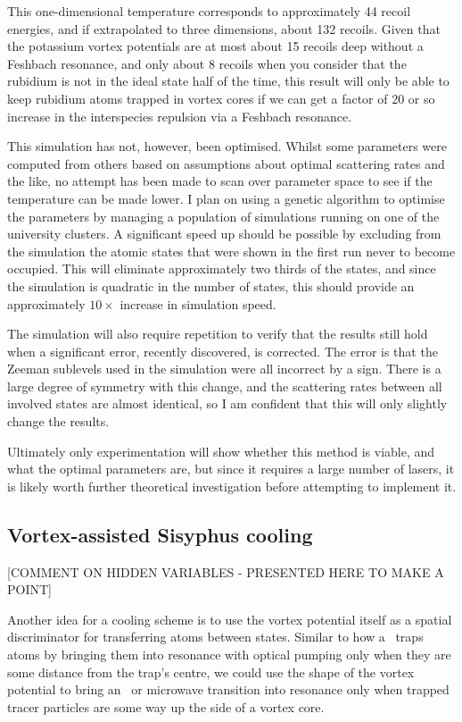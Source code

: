 This one-dimensional temperature corresponds to approximately 44 recoil energies, and if extrapolated to three dimensions, about 132 recoils. Given that the potassium vortex potentials are at most about 15 recoils deep without a Feshbach resonance, and only about 8 recoils when you consider that the rubidium is not in the ideal state half of the time, this result will only be able to keep rubidium atoms trapped in vortex cores if we can get a factor of 20 or so increase in the interspecies repulsion via a Feshbach resonance.

This simulation has not, however, been optimised. Whilst some parameters were computed from others based on assumptions about optimal scattering rates and the like, no attempt has been made to scan over parameter space to see if the temperature can be made lower. I plan on using a genetic algorithm to optimise the parameters by managing a population of simulations running on one of the university clusters. A significant speed up should be possible by excluding from the simulation the atomic states that were shown in the first run never to become occupied. This will eliminate approximately two thirds of the states, and since the simulation is quadratic in the number of states, this should provide an approximately $10\times$ increase in simulation speed.

The simulation will also require repetition to verify that the results still hold when a significant error, recently discovered, is corrected. The error is that the Zeeman sublevels used in the simulation were all incorrect by a sign. There is a large degree of symmetry with this change, and the scattering rates between all involved states are almost identical, so I am confident that this will only slightly change the results.

Ultimately only experimentation will show whether this method is viable, and what the optimal parameters are, but since it requires a large number of lasers, it is likely worth further theoretical investigation before attempting to implement it.

\subsection{Vortex-assisted Sisyphus cooling}\label{sec:vortexcooling}

[COMMENT ON HIDDEN VARIABLES - PRESENTED HERE TO MAKE A POINT]

Another idea for a cooling scheme is to use the vortex potential itself as a spatial discriminator for transferring atoms between states. Similar to how a \mot\ traps atoms by bringing them into resonance with optical pumping only when they are some distance from the trap's centre, we could use the shape of the vortex potential to bring an \rf\ or microwave transition into resonance only when trapped tracer particles are some way up the side of a vortex core.

